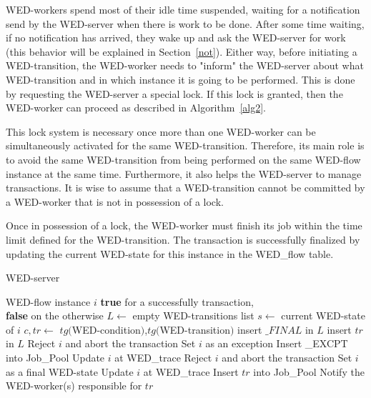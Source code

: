 \documentclass[12pt]{article}
\begin{document}
\par  WED-workers spend most of their idle time suspended, waiting for a notification send by the WED-server when there is work  to be done. After some time waiting, if no notification has arrived, they wake up and ask the WED-server for work (this behavior will be explained in Section~\ref{not}). Either way, before initiating a WED-transition, the WED-worker needs to  "inform" the WED-server about what WED-transition and in which instance it is going to be performed. This is done by requesting the WED-server a special lock. If this lock is granted, then the WED-worker can proceed as described in Algorithm~\ref{alg2}.

\par This lock system is necessary once more than one WED-worker can be simultaneously activated for the same WED-transition. Therefore, its main role is to avoid the same WED-transition from being performed on the same WED-flow instance at the same time. Furthermore, it also helps the WED-server to manage transactions. It is wise to assume that  a WED-transition cannot be committed by a WED-worker that is not in possession of a lock. 

\par Once in possession of a lock, the WED-worker must finish its job within the time limit defined for the WED-transition. The transaction is successfully finalized by updating the current WED-state for this instance in the WED\_flow table.

\begin{algorithm}
\caption{WED-server}
\label{alg1}
\begin{algorithmic}[1]
\REQUIRE WED-flow instance $i$
\ENSURE \textbf{true} for a successfully transaction,\\
         \hspace{23pt}\textbf{false} on the otherwise
\STATE $L \leftarrow$ empty WED-transitions list 
\STATE $s \leftarrow$ current WED-state of $i$
\STATE $c,tr \leftarrow$ $tg($WED-condition$)$,$tg($WED-transition$)$
\STATE insert $\_FINAL$ in $L$
\ELSE
\STATE insert $tr$ in $L$
\ENDIF
\ENDIF
\ENDFOR
{}
\STATE Reject $i$ and abort the transaction
\RETURN \FALSE
{}
\STATE Set $i$ as an exception
\STATE Insert \_EXCPT into Job\_Pool
\ENDIF
\STATE Update $i$ at WED\_trace
\RETURN \TRUE
{}
\STATE Reject $i$ and abort the transaction
\RETURN \FALSE
\ELSE
\STATE Set $i$ as a final WED-state
\STATE Update $i$ at WED\_trace
\RETURN \TRUE
\ENDIF
\ELSE
{}
\STATE Insert $tr$ into Job\_Pool
\STATE Notify the WED-worker(s) responsible for $tr$
\RETURN \TRUE
\ENDFOR
\ENDIF

\end{algorithmic}
\end{algorithm}
\end{document}
